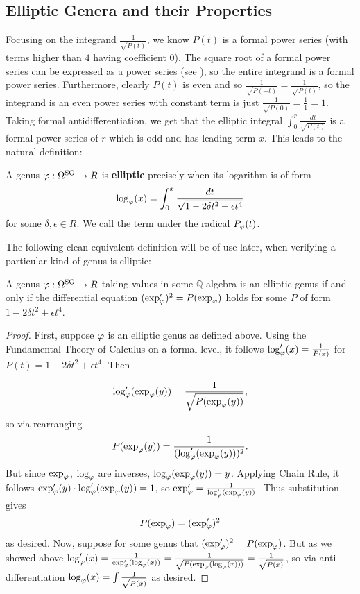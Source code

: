 \subsection{Elliptic Genera and their Properties}

Focusing on the integrand $\frac{1}{\sqrt{P(t)}}$, we know $P(t)$ is a formal power series (with terms higher than $4$ having coefficient $0$). The square root of a formal power series can be expressed as a power series (see \cite{Niven_1969}), so the entire integrand is a formal power series. Furthermore, clearly $P(t)$ is even and so $\frac{1}{\sqrt{P(-t)}} = \frac{1}{\sqrt{P(t)}}$, so the integrand is an even power series with constant term is just $\frac{1}{\sqrt{P(0)}} = \frac{1}{1} = 1$. Taking formal antidifferentiation, we get that the elliptic integral  $\int_0^r \frac{dt}{\sqrt{P(t)}}$ is a formal power series of $r$  which is odd and has leading term $x$. This leads to the natural definition:

\begin{definition}
    A genus $\varphi: \Omega^{\text{SO}} \to R$ is \textbf{elliptic} precisely when its logarithm is of form 
    \[\log_\varphi (x) = \int_0^x \frac{dt}{\sqrt{1 - 2 \delta t^2 + \epsilon t^4}}\]
for some $\delta, \epsilon \in R$. We call the term under the radical $P_\varphi (t)$.
\end{definition}

The following clean equivalent definition will be of use later, when verifying a particular kind of genus is elliptic: 
\begin{proposition}
    A genus $\varphi: \Omega^{\text{SO}} \to R$ taking values in some $\mathbb{Q}$-algebra is an elliptic genus if and only if the differential equation $(\exp_\varphi ')^2 = P(\exp_\varphi)$ holds for some $P$ of form $1 - 2 \delta t^2 + \epsilon t^4$.
\end{proposition}

\begin{proof}
First, suppose $\varphi$ is an elliptic genus as defined above. Using the Fundamental Theory of Calculus on a formal level, it follows $\log_\varphi'(x) = \frac{1}{P(x)}$ for $P(t) = 1 - 2 \delta t^2 + \epsilon t^4$. Then

\[\log'_\varphi (\exp_\varphi(y)) = \frac{1}{\sqrt{P(\exp_\varphi (y))}},\]
so via rearranging
\[ P (\exp_\varphi (y)) = \frac{1}{ (\log'_\varphi (\exp_\varphi(y)))^2} .\]
But since $\exp_\varphi$, $\log_\varphi$ are inverses, $\log_\varphi (\exp_\varphi (y)) = y$.  Applying Chain Rule, it follows $\exp_\varphi' (y) \cdot \log_\varphi' (\exp_\varphi (y)) = 1$, so $\exp'_\varphi = \frac{1}{\log_\varphi' (\exp_\varphi (y)) }$. Thus substitution gives
\[P(\exp_\varphi) = (\exp_\varphi')^2\]
as desired. Now, suppose for some genus that  $(\exp_\varphi ')^2 = P(\exp_\varphi)$. But as we showed above $\log_\varphi'(x)  = \frac{1}{\exp_\varphi' (\log_\varphi(x))} = \frac{1}{\sqrt{P(\exp_\varphi (\log_\varphi (x)))}} = \frac{1}{\sqrt{P(x)}} $, so via anti-differentiation $ \log_\varphi (x) = \int \frac{1}{\sqrt{P(x)}}$ as desired. 
\end{proof}

